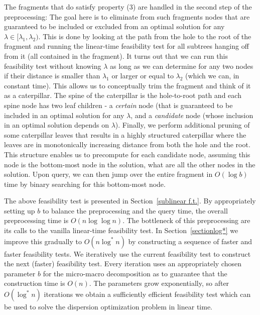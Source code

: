 \documentclass[11pt,a4paper]{article}
\theoremstyle{definition}
\theoremstyle{remark}
\begin{document}
The fragments that do satisfy property (3) are handled in the second step of the preprocessing: The goal here is to eliminate from such fragments nodes that are guaranteed to be included or excluded from an optimal solution for any $\lambda \in [\lambda_1,\lambda_2)$. This is done by looking at the path from the hole to the root of the fragment and running the linear-time feasibility test for all subtrees hanging off from it (all contained in the fragment). It turns out that we can run this feasibility test without knowing $\lambda$ as long as we can determine for any two nodes if their distance is smaller than $\lambda_1$ or larger or equal to $\lambda_2$ (which we can, in constant time). This allows us to conceptually trim the fragment and think of it as a caterpillar. The spine of the caterpillar is the hole-to-root path and each spine node has two leaf children - a \emph{certain} node (that is guaranteed to be included in an optimal solution for any $\lambda$, and a \emph{candidate} node (whose inclusion in an optimal solution depends on $\lambda$). Finally, we perform additional pruning of some caterpillar leaves that results in a highly structured caterpillar where the leaves are in monotonically increasing distance from both the hole and the root. This structure enables us to precompute for each candidate node, assuming this node is the bottom-most node in the solution, what are all the other nodes in the solution. Upon query, we can then jump over the entire fragment  in $O(\log b)$ time by binary searching for this bottom-most node. 

The above feasibility test is presented in Section~\ref{sublinear f.t.}. By appropriately setting up $b$ to balance the preprocessing and the query time, the overall preprocessing time is $O(n\log\log n)$. The bottleneck of this preprocessing are its calls to the vanilla linear-time feasibility test.  
In Section~\ref{sectionlog*} we improve this gradually to $O(n\log^* n)$ by constructing a sequence of faster and faster feasibility tests. 
We iteratively use the current feasibility test to construct the next (faster) feasibility test.
Every iteration uses an appropriately chosen parameter $b$ for the micro-macro decomposition
as to guarantee that the construction time is $O(n)$. The parameters grow exponentially,
so after $O(\log^{*}n)$ iterations we obtain a sufficiently efficient feasibility test which can be used to solve the dispersion optimization problem in linear time. 
\end{document}
